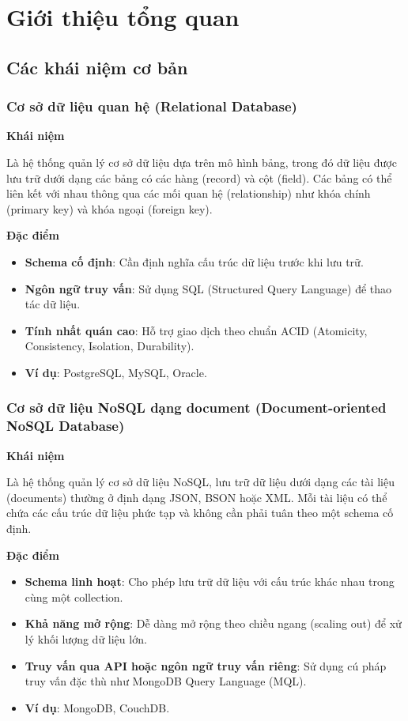 \section{Giới thiệu tổng quan}
\subsection{Các khái niệm cơ bản}
\subsubsection{Cơ sở dữ liệu quan hệ (Relational Database)}

\textbf{Khái niệm}

Là hệ thống quản lý cơ sở dữ liệu dựa trên mô hình bảng, trong đó dữ liệu được lưu trữ dưới dạng các bảng có các hàng (record) và cột (field). Các bảng có thể liên kết với nhau thông qua các mối quan hệ (relationship) như khóa chính (primary key) và khóa ngoại (foreign key).

\noindent
\textbf{Đặc điểm}
\begin{itemize}
    \item \textbf{Schema cố định}: Cần định nghĩa cấu trúc dữ liệu trước khi lưu trữ.
    \item \textbf{Ngôn ngữ truy vấn}: Sử dụng SQL (Structured Query Language) để thao tác dữ liệu.
    \item \textbf{Tính nhất quán cao}: Hỗ trợ giao dịch theo chuẩn ACID (Atomicity, Consistency, Isolation, Durability).
    \item \textbf{Ví dụ}: PostgreSQL, MySQL, Oracle.
\end{itemize}



\subsubsection{Cơ sở dữ liệu NoSQL dạng document (Document-oriented NoSQL Database)}

\textbf{Khái niệm}

Là hệ thống quản lý cơ sở dữ liệu NoSQL, lưu trữ dữ liệu dưới dạng các tài liệu (documents) thường ở định dạng JSON, BSON hoặc XML. Mỗi tài liệu có thể chứa các cấu trúc dữ liệu phức tạp và không cần phải tuân theo một schema cố định.

\noindent
\textbf{Đặc điểm}
\begin{itemize}
    \item \textbf{Schema linh hoạt}: Cho phép lưu trữ dữ liệu với cấu trúc khác nhau trong cùng một collection.
    \item \textbf{Khả năng mở rộng}: Dễ dàng mở rộng theo chiều ngang (scaling out) để xử lý khối lượng dữ liệu lớn.
    \item \textbf{Truy vấn qua API hoặc ngôn ngữ truy vấn riêng}: Sử dụng cú pháp truy vấn đặc thù như MongoDB Query Language (MQL).
    \item \textbf{Ví dụ}: MongoDB, CouchDB.
\end{itemize}


